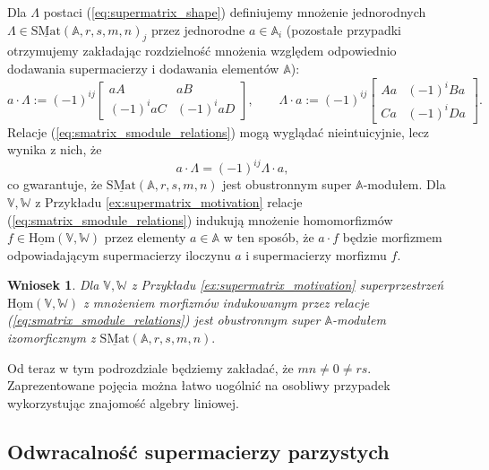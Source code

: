 \documentclass[11pt,a4paper]{report}
\newtheorem{corollary}[theorem]{Wniosek}
\theoremstyle{definition}
\begin{document}
Dla $\Lambda$ postaci (\ref{eq:supermatrix_shape}) definiujemy mnożenie jednorodnych $\Lambda \in \underline{\mathrm{SMat}}(\mathbb{A},r,s,m,n)_j$ przez jednorodne $a \in \mathbb{A}_i$ (pozostałe przypadki otrzymujemy zakładając rozdzielność mnożenia względem odpowiednio dodawania supermacierzy i dodawania elementów $\mathbb{A}$):
\begin{equation}
	\label{eq:smatrix_smodule_relations}
	a \cdot \Lambda := (-1)^{ij} \begin{bmatrix}
	aA & aB \\
	(-1)^{i} aC & (-1)^{i} aD
	\end{bmatrix}\!\!, \qquad
	\Lambda \cdot a := (-1)^{ij} \begin{bmatrix}
	Aa & (-1)^{i} Ba \\
	Ca & (-1)^{i} Da
	\end{bmatrix}\!\!.
\end{equation}
Relacje (\ref{eq:smatrix_smodule_relations}) mogą wyglądać nieintuicyjnie, lecz wynika z nich, że
\begin{equation*}
	a \cdot \Lambda = (-1)^{ij} \Lambda \cdot a,
\end{equation*}
co gwarantuje, że $\underline{\mathrm{SMat}}(\mathbb{A},r,s,m,n)$ jest obustronnym super $\mathbb{A}$-modułem. Dla $\mathbb{V}, \mathbb{W}$ z Przykładu \ref{ex:supermatrix_motivation} relacje (\ref{eq:smatrix_smodule_relations}) indukują mnożenie homomorfizmów $f \in \underline{\mathrm{Hom}}(\mathbb{V},\mathbb{W})$ przez elementy $a \in \mathbb{A}$ w ten sposób, że $a\cdot f$ będzie morfizmem odpowiadającym supermacierzy iloczynu $a$ i supermacierzy morfizmu $f$. 

\begin{corollary}
	Dla $\mathbb{V}, \mathbb{W}$ z Przykładu \ref{ex:supermatrix_motivation} superprzestrzeń $\underline{\mathrm{Hom}}(\mathbb{V},\mathbb{W})$ z mnożeniem morfizmów indukowanym przez relacje (\ref{eq:smatrix_smodule_relations}) jest obustronnym super $\mathbb{A}$-modułem izomorficznym z $\underline{\mathrm{SMat}}(\mathbb{A},r,s,m,n).$
\end{corollary}

Od teraz w tym podrozdziale będziemy zakładać, że $mn \neq 0 \neq rs$. Zaprezentowane pojęcia można łatwo uogólnić na osobliwy przypadek wykorzystując znajomość algebry liniowej.

\subsection{Odwracalność supermacierzy parzystych}
\end{document}
